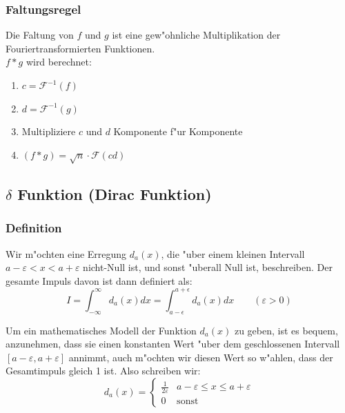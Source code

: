 \documentclass[german, 10pt, a4paper, twocolumn]{scrartcl}
\begin{document}
\subsubsection{Faltungsregel}

Die Faltung von $f$ und $g$ ist eine gew"ohnliche Multiplikation der Fouriertransformierten Funktionen.\\

$f\ast g$ wird berechnet:
\begin{enumerate}
	\item $c = \mathcal{F}^{-1}(f)$
	\item $d = \mathcal{F}^{-1}(g)$
	\item Multipliziere $c$ und $d$ Komponente f"ur Komponente
	\item $(f\ast g) = \sqrt{n} \cdotp \mathcal{F}(cd)$		%
\end{enumerate}

\subsection{$\delta$ Funktion (Dirac Funktion)}

\subsubsection{Definition}

Wir m"ochten eine Erregung $d_a(x)$, die "uber einem kleinen Intervall $a-\varepsilon < x < a+\varepsilon$ nicht-Null ist, und sonst "uberall Null ist, beschreiben. Der gesamte Impuls davon ist dann definiert als:
\begin{displaymath}
	I = \int^\infty_{-\infty} d_a(x) dx = \int^{a+\epsilon}_{a-\epsilon} d_a(x) dx\qquad (\varepsilon > 0)
\end{displaymath}

Um ein mathematisches Modell der Funktion $d_a(x)$ zu geben, ist es bequem, anzunehmen, dass sie einen konstanten Wert "uber dem geschlossenen Intervall $[a-\varepsilon, a+\varepsilon]$ annimmt, auch m"ochten wir diesen Wert so w"ahlen, dass der Gesamtimpuls gleich 1 ist. Also schreiben wir:
\begin{displaymath}
	d_a(x) = \left \{
		\begin{array}{cc}
			\frac{1}{2\varepsilon}&		a-\varepsilon \leq x \leq a + \varepsilon \\
			0 &				\mbox{sonst}
		\end{array}
		\right .
\end{displaymath}
\end{document}
